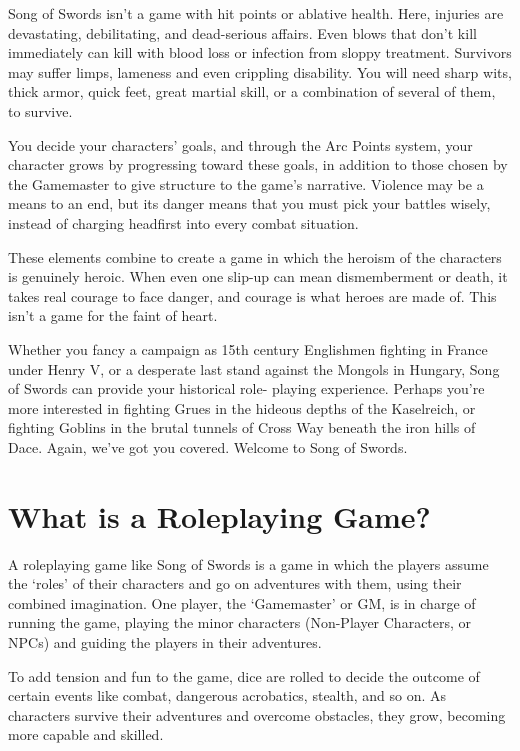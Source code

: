 \documentclass[oneside,11pt,english]{book}
\begin{document}
Song of Swords isn't a game with hit points or ablative health. Here, injuries are devastating, debilitating, 
and dead-serious affairs. Even blows that don't kill immediately can kill with blood loss or infection from 
sloppy treatment. Survivors may suffer limps, lameness and even crippling disability. You will need sharp 
wits, thick armor, quick feet, great martial skill, or a combination of several of them, to survive. 


You decide your characters' goals, and through the Arc Points system, your character grows by 
progressing toward these goals, in addition to those chosen by the Gamemaster to give structure to the 
game's narrative. Violence may be a means to an end, but its danger means that you must pick your 
battles wisely, instead of charging headfirst into every combat situation. 


These elements combine to create a game in which the heroism of the characters is genuinely heroic. 
When even one slip-up can mean dismemberment or death, it takes real courage to face danger, and 
courage is what heroes are made of. This isn't a game for the faint of heart. 


Whether you fancy a campaign as 15th century Englishmen fighting in France under Henry V, or a 
desperate last stand against the Mongols in Hungary, Song of Swords can provide your historical role-
playing experience. Perhaps you’re more interested in fighting Grues in the hideous depths of the 
Kaselreich, or fighting Goblins in the brutal tunnels of Cross Way beneath the iron hills of Dace. Again, 
we’ve got you covered.
Welcome to Song of Swords. 


\section{What is a Roleplaying Game?}
A roleplaying game like Song of Swords is a game in which the players assume the ‘roles’ of their 
characters and go on adventures with them, using their combined imagination. One player, the 
‘Gamemaster’ or GM, is in charge of running the game, playing the minor characters (Non-Player 
Characters, or NPCs) and guiding the players in their adventures.


To add tension and fun to the game, dice are rolled to decide the outcome of certain events like combat, 
dangerous acrobatics, stealth, and so on. As characters survive their adventures and overcome obstacles, 
they grow, becoming more capable and skilled. 
\end{document}
